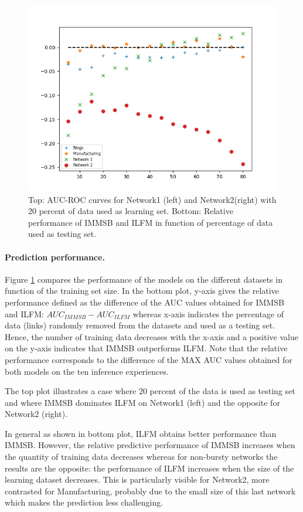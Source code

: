 \begin{figure}[h]
\begin{minipage}{0.4\textwidth}
        \includegraphics[width=\textwidth]{img/corpus/testset_max_20.png}
    \end{minipage}
    \caption{Top: AUC-ROC curves for Network1 (left) and Network2(right) with 20 percent of data used as learning set. Bottom: Relative performance of IMMSB and ILFM in function of percentage of data used as testing set.} 
\label{fig:auc}
\end{figure}


\paragraph{Prediction performance.}

Figure \ref{fig:auc} compares the performance  of the models on the different datasets in function of the training set size. In the bottom plot,  y-axis gives the relative performance defined as the difference of the AUC values obtained for IMMSB and ILFM: $AUC_{IMMSB} - AUC_{ILFM}$ whereas x-axis indicates the percentage of data (links) randomly removed from the datasets and  used as a testing set. Hence, the number of training data decreases with the x-axis and a positive value on the y-axis indicates that IMMSB outperforms ILFM.  Note that the relative performance corresponds to the difference of the MAX AUC values obtained for both models on the ten inference experiences.

The top plot illustrates a case where 20 percent of the data is used as testing set and where IMMSB dominates ILFM on Network1 (left) and the opposite for Network2 (right).

In general as shown in bottom plot, ILFM obtains better performance than IMMSB. However, the relative predictive performance of IMMSB  increases  when the quantity of training data decreases whereas for non-bursty networks the results are the opposite: the performance of ILFM increases when the size of the learning dataset decreases. This is particularly visible for Network2, more contrasted for Manufacturing, probably due to the small size of this last network which makes the prediction less challenging.


